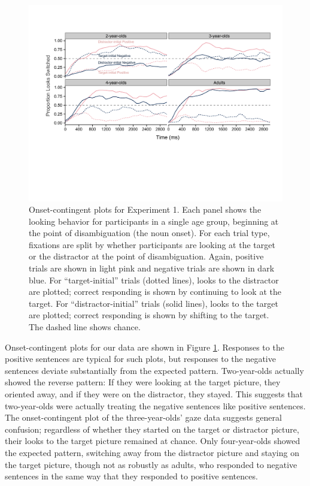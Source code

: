 \documentclass[man]{apa2}
\begin{document}
\begin{figure}
\begin{center} 
\includegraphics[width=6in]{OC_nothing.pdf}
\caption{\label{fig:e1split} Onset-contingent plots for Experiment 1. Each panel shows the looking behavior for participants in a single age group, beginning at the point of disambiguation (the noun onset). For each trial type, fixations are split by whether participants are looking at the target or the distractor at the point of disambiguation. Again, positive trials are shown in light pink and negative trials are shown in dark blue. For ``target-initial'' trials (dotted lines), looks to the distractor are plotted; correct responding is shown by continuing to look at the target. For ``distractor-initial'' trials (solid lines), looks to the target are plotted; correct responding is shown by shifting to the target. The dashed line shows chance.}
\end{center} 
\end{figure}

Onset-contingent plots for our data are shown in Figure \ref{fig:e1split}. Responses to the positive sentences are typical for such plots, but responses to the negative sentences deviate substantially from the expected pattern.  Two-year-olds actually showed the reverse pattern: If they were looking at the target picture, they oriented away, and if they were on the distractor, they stayed.  This suggests that two-year-olds were actually treating the negative sentences like positive sentences.  The onset-contingent plot of the three-year-olds' gaze data suggests general confusion; regardless of whether they started on the target or distractor picture, their looks to the target picture remained at chance.  Only four-year-olds showed the expected pattern, switching away from the distractor picture and staying on the target picture, though not as robustly as adults, who responded to negative sentences in the same way that they responded to positive sentences.  
\end{document}

